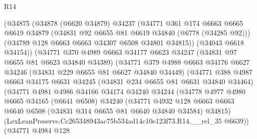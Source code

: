 \begin{lexlean}{R14}
\begin{coremodule}
                    (@34875
                      (@34878
                        (@6620 @34879)
                        @34237
                        (@34771
                          @361
                          @174
                          @6663
                          @6665
                          @6619
                          @34879
                          (@34831 @92 @6655 @81 @6619 @34840 (@6778 (@34285 @92)))
                          (@34789 @128 @6663 @6663 @34307 @6508 @34801 @34815))
                        (@34043 @6618 @34154))
                      (@34771
                        @370
                        @4989
                        @6663
                        @34177
                        @6623
                        @34247
                        (@34831 @97 @6655 @81 @6623 @34840 @34389)
                        (@34771
                          @379
                          @4988
                          @6663
                          @34176
                          @6627
                          @34246
                          (@34831 @229 @6655 @81 @6627 @34840 @34449)
                          (@34771
                            @388
                            @4987
                            @6663
                            @34175
                            @6631
                            @34245
                            (@34831 @234 @6655 @81 @6631 @34840 @34464)
                            (@34771
                              @4981
                              @4986
                              @34166
                              @34174
                              @34240
                              @34244
                              (@34778
                                @4977
                                @4980
                                @6665
                                @34165
                                (@6641 @6508)
                                @34240
                                (@34771
                                  @4932
                                  @128
                                  @6663
                                  @6663
                                  @6640
                                  @6508
                                  (@34831 @314 @6655 @81 @6640 @34840 @34584)
                                  @34815)
                                (LexLeanPreserve.Cc265348943ac75b534ad14c10e123f73.R14.__rel_35
                                  @6639))
                              (@34771
                                @4984
                                @128

\end{coremodule}
\end{lexlean}
